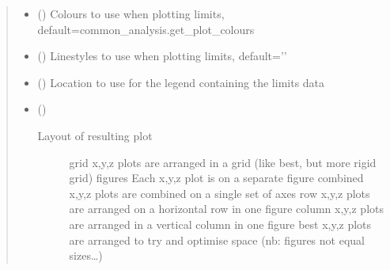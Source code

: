 \documentclass[letterpaper,10pt,english]{sphinxmanual}
\begin{document}
\begin{fulllineitems}
\begin{quote}
\begin{description}
\begin{itemize}
\item {} 
\sphinxAtStartPar
{} (\sphinxstyleliteralemphasis{\sphinxupquote{, }}) \textendash{} Colours to use when plotting limits, default=common\_analysis.get\_plot\_colours

\item {} 
\sphinxAtStartPar
{} (\sphinxstyleliteralemphasis{\sphinxupquote{, }}) \textendash{} Linestyles to use when plotting limits, default=’\sphinxhyphen{}’

\item {} 
\sphinxAtStartPar
{} (\sphinxstyleliteralemphasis{\sphinxupquote{, }}) \textendash{} Location to use for the legend containing the limits data

\item {} 
\sphinxAtStartPar
{} (\sphinxstyleliteralemphasis{\sphinxupquote{, }}\sphinxstyleliteralemphasis{\sphinxupquote{, }}\sphinxstyleliteralemphasis{\sphinxupquote{, }}\sphinxstyleliteralemphasis{\sphinxupquote{, }}\sphinxstyleliteralemphasis{\sphinxupquote{, }}\sphinxstyleliteralemphasis{\sphinxupquote{, }}) \textendash{} \begin{description}
\item[{Layout of resulting plot}] \leavevmode
\sphinxAtStartPar
grid        x,y,z plots are arranged in a grid (like best, but more rigid grid)
figures     Each x,y,z plot is on a separate figure
combined    x,y,z plots are combined on a single set of axes
row         x,y,z plots are arranged on a horizontal row in one figure
column      x,y,z plots are arranged in a vertical column in one figure
best        x,y,z plots are arranged to try and optimise space (nb: figures not equal sizes…)


\end{description}
\end{itemize}
\end{description}
\end{quote}
\end{fulllineitems}
\end{document}
